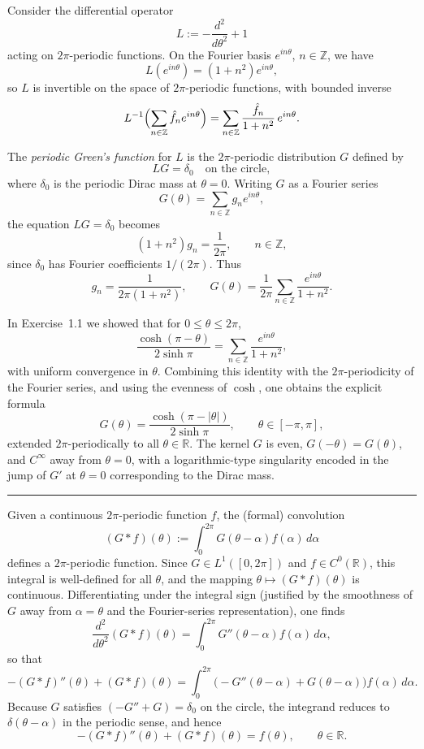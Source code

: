\documentclass[12pt,a4paper]{article}
\theoremstyle{plain}
\theoremstyle{definition}
\theoremstyle{remark}
\theoremstyle{remark}
\begin{document}
Consider the differential operator
\[
L := -\frac{d^2}{d\theta^2} + 1
\]
acting on $2\pi$-periodic functions. On the Fourier basis
$e^{in\theta}$, $n\in\mathbb{Z}$, we have
\[
L(e^{in\theta}) = (1+n^2)e^{in\theta},
\]
so $L$ is invertible on the space of $2\pi$-periodic functions, with
bounded inverse
\[
L^{-1}\Bigl(\sum_{n\in\mathbb{Z}} \hat f_n e^{in\theta}\Bigr)
= \sum_{n\in\mathbb{Z}} \frac{\hat f_n}{1+n^2}\,e^{in\theta}.
\]

\medskip

The \emph{periodic Green's function} for $L$ is the $2\pi$-periodic
distribution $G$ defined by
\[
L G = \delta_0\quad\text{on the circle},
\]
where $\delta_0$ is the periodic Dirac mass at $\theta=0$. Writing
$G$ as a Fourier series
\[
G(\theta) = \sum_{n\in\mathbb{Z}} g_n e^{in\theta},
\]
the equation $LG=\delta_0$ becomes
\[
(1+n^2)g_n = \frac{1}{2\pi},\qquad n\in\mathbb{Z},
\]
since $\delta_0$ has Fourier coefficients $1/(2\pi)$. Thus
\[
g_n = \frac{1}{2\pi(1+n^2)},\qquad
G(\theta) = \frac{1}{2\pi}\sum_{n\in\mathbb{Z}}
\frac{e^{in\theta}}{1+n^2}.
\]

In Exercise~1.1 we showed that for $0\le\theta\le 2\pi$,
\[
\frac{\cosh(\pi-\theta)}{2\sinh\pi}
= \sum_{n\in\mathbb{Z}}\frac{e^{in\theta}}{1+n^2},
\]
with uniform convergence in $\theta$. Combining this identity with the
$2\pi$-periodicity of the Fourier series, and using the evenness of
$\cosh$, one obtains the explicit formula
\[
G(\theta)
= \frac{\cosh(\pi-|\theta|)}{2\sinh\pi},
\qquad \theta\in[-\pi,\pi],
\]
extended $2\pi$-periodically to all $\theta\in\mathbb{R}$. The kernel
$G$ is even, $G(-\theta)=G(\theta)$, and $C^\infty$ away from
$\theta=0$, with a logarithmic-type singularity encoded in the jump of
$G'$ at $\theta=0$ corresponding to the Dirac mass.

\bigskip
\noindent\rule{\textwidth}{0.4pt}
\medskip

Given a continuous $2\pi$-periodic function $f$, the (formal)
convolution
\[
(G*f)(\theta)
:= \int_0^{2\pi} G(\theta-\alpha)f(\alpha)\,d\alpha
\]
defines a $2\pi$-periodic function. Since
$G\in L^1([0,2\pi])$ and $f\in C^0(\mathbb{R})$, this integral is
well-defined for all $\theta$, and the mapping
$\theta\mapsto(G*f)(\theta)$ is continuous. Differentiating under the
integral sign (justified by the smoothness of $G$ away from
$\alpha=\theta$ and the Fourier-series representation), one finds
\[
\frac{d^2}{d\theta^2}(G*f)(\theta)
= \int_0^{2\pi} G''(\theta-\alpha) f(\alpha)\,d\alpha,
\]
so that
\[
-(G*f)''(\theta) + (G*f)(\theta)
= \int_0^{2\pi}\bigl(-G''(\theta-\alpha)+G(\theta-\alpha)\bigr)
f(\alpha)\,d\alpha.
\]
Because $G$ satisfies $(-G''+G)=\delta_0$ on the circle, the integrand
reduces to $\delta(\theta-\alpha)$ in the periodic sense, and hence
\[
-(G*f)''(\theta) + (G*f)(\theta) = f(\theta),
\qquad \theta\in\mathbb{R}.
\]
\end{document}
